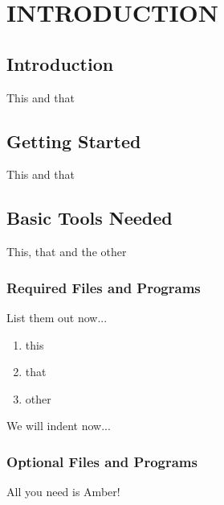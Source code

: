 \chapter{INTRODUCTION}

\section{Introduction}%
This and that
\section{Getting Started}
This and that
\section{Basic Tools Needed}
This, that and the other
\subsection{Required Files and Programs} %
List them out now...
 \begin{enumerate} %
    \item this \vspace{-10pt}%
    \item that \vspace{-10pt}
    \item other \vspace{-10pt}%
 \end{enumerate}

We will indent now...

\subsection{Optional Files and Programs}

All you need is Amber!

